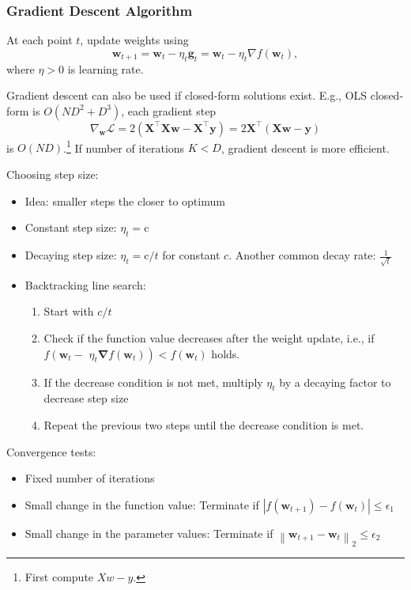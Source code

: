 \documentclass[11pt, %
	oneside, %
	english, %
	onehalfspacing, %
	parskip, %
	]{article} %
\theoremstyle{definition}
\begin{document}
\subsubsection*{Gradient Descent Algorithm}

At each point $t$, update weights using
\begin{equation*}
	\mathbf{w}_{t+1}=\mathbf{w}_t-\eta_t \mathbf{g}_t=\mathbf{w}_t-\eta_t \nabla f\left(\mathbf{w}_t\right),
\end{equation*}
where $\eta > 0$ is learning rate.

Gradient descent can also be used if closed-form solutions exist. E.g., OLS closed-form is $O(ND^2 + D^3)$, each gradient step
\begin{equation*}
	\nabla_{\mathbf{w}} \mathcal{L}=2\left(\mathbf{X}^{\top} \mathbf{X} \mathbf{w}-\mathbf{X}^{\top} \mathbf{y}\right) = 2 \mathbf{X}^{\top} \left( \mathbf{X} \mathbf{w}- \mathbf{y}\right)
\end{equation*}
is $O(ND)$.\footnote{First compute $X w - y$.} If number of iterations $K < D$, gradient descent is more efficient.

Choosing step size:
\begin{itemize}
	\item Idea: smaller steps the closer to optimum
	\item Constant step size: $\eta_t=\mathrm{c}$
	\item Decaying step size: $\eta_t=\mathrm{c} / t$ for constant $c$. Another common decay rate: $\frac{1}{\sqrt{t}}$
	\item Backtracking line search:
	\begin{enumerate}
		\item Start with $c/t$
		\item Check if the function value decreases after the weight update, i.e., if $f\left(\mathbf{w}_t-\right.$ $\left.\eta_t \boldsymbol{\nabla} f\left(\mathbf{w}_t\right)\right)<f\left(\mathbf{w}_t\right)$ holds.
		\item If the decrease condition is not met, multiply $\eta_t$ by a decaying factor to decrease step size
		\item Repeat the previous two steps until the decrease condition is met.
	\end{enumerate}
\end{itemize}

Convergence tests:
\begin{itemize}
	\item Fixed number of iterations
	\item Small change in the function value: Terminate if $\left|f\left(\mathbf{w}_{t+1}\right)-f\left(\mathbf{w}_t\right)\right| \leq \epsilon_1$
	\item Small change in the parameter values: Terminate if $\left\|\mathbf{w}_{t+1}-\mathbf{w}_t\right\|_2 \leq \epsilon_2$
\end{itemize}
\end{document}
